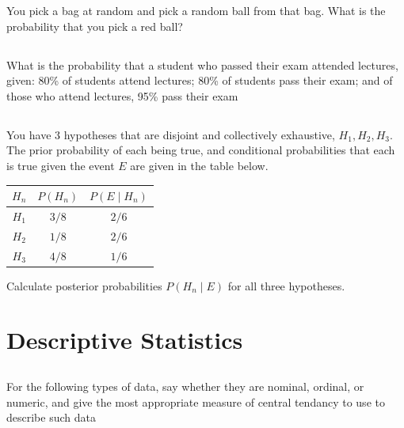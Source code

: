 \documentclass[twocolumn]{article}
\newcommand\mrk[1]{}
\begin{document}
    You pick a bag at random and pick a random ball from that bag. What is the probability that you pick a red ball? \mrk{1}

\subsection{}

    What is the probability that a student who passed their exam attended lectures, given: 80\% of students attend lectures; 80\% of students pass their exam; and of those who attend lectures, 95\% pass their exam
\mrk{1}
    
\subsection{}

    You have 3 hypotheses that are disjoint and collectively exhaustive, $H_1, H_2, H_3$. The prior probability of each being true, and conditional probabilities that each is true given the event $E$ are given in the table below.

    \begin{table}[h!]
        \centering
        \begin{tabular}{c | c | c }
            \toprule
            $H_n$ & $P(H_n)$ & $P(E \mid H_n)$ \\
            \midrule
            $H_1$ & ${3}/{8}$ & ${2}/{6}$  \\
            $H_2$ & ${1}/{8}$ & ${2}/{6}$  \\
            $H_3$ & ${4}/{8}$ & ${1}/{6}$ \\
            \bottomrule
        \end{tabular}
    \end{table}

    Calculate posterior probabilities $P( H_n \mid E)$ for all three hypotheses. \mrk{3}
    

\clearpage
\setcounter{page}{12}
\setcounter{section}{11}
\section{Descriptive Statistics}

\subsection{}

    For the following types of data, say whether they are nominal, ordinal, or numeric, and give the most appropriate measure of central tendancy to use to describe such data
\end{document}
